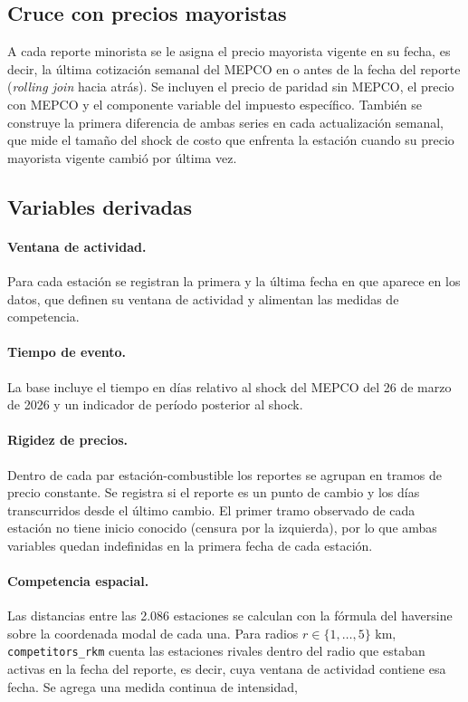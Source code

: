 \documentclass[11pt]{article}
\begin{document}
\subsection{Cruce con precios mayoristas}
\label{sec:mepco}

A cada reporte minorista se le asigna el precio mayorista vigente en su
fecha, es decir, la última cotización semanal del MEPCO en o antes de la
fecha del reporte (\emph{rolling join} hacia atrás). Se incluyen el precio de
paridad sin MEPCO, el precio con MEPCO y el componente variable del impuesto
específico. También se construye la primera diferencia de ambas series en
cada actualización semanal, que mide el tamaño del shock de costo que
enfrenta la estación cuando su precio mayorista vigente cambió por última
vez.

\subsection{Variables derivadas}
\label{sec:derivadas}

\paragraph{Ventana de actividad.} Para cada estación se registran la primera
y la última fecha en que aparece en los datos, que definen su ventana de
actividad y alimentan las medidas de competencia.

\paragraph{Tiempo de evento.} La base incluye el tiempo en días relativo al
shock del MEPCO del 26 de marzo de 2026 y un indicador de período posterior
al shock.

\paragraph{Rigidez de precios.} Dentro de cada par estación-combustible los
reportes se agrupan en tramos de precio constante. Se registra si el reporte
es un punto de cambio y los días transcurridos desde el último cambio. El
primer tramo observado de cada estación no tiene inicio conocido (censura por
la izquierda), por lo que ambas variables quedan indefinidas en la primera
fecha de cada estación.

\paragraph{Competencia espacial.} Las distancias entre las 2.086 estaciones
se calculan con la fórmula del haversine sobre la coordenada modal de cada
una. Para radios $r \in \{1,\dots,5\}$ km, \texttt{competitors\_rkm} cuenta
las estaciones rivales dentro del radio que estaban activas en la fecha del
reporte, es decir, cuya ventana de actividad contiene esa fecha. Se agrega
una medida continua de intensidad,
\end{document}
